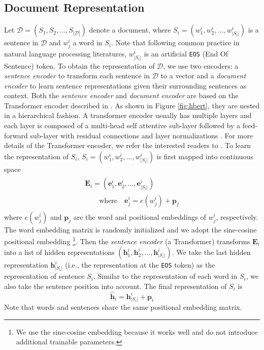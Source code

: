 \documentclass[11pt,a4paper]{article}
\begin{document}
\subsection{Document Representation}
\label{sec:doc_repr}
Let $\mathcal{D} = (S_1, S_2, \dots, S_{| \mathcal{D} |})$ denote a document,  where $S_i = (w_1^i, w_2^i, \dots, w_{|S_i|}^i)$ is a sentence in $\mathcal{D}$ and $w_j^i$ a word in $S_i$. Note that following common practice in natural language processing literatures, $w_{|S_i|}^i$ is an artificial {\tt EOS} (End Of Sentence) token. To obtain the representation of $\mathcal{D}$, we use two encoders: a \emph{sentence encoder} to transform each sentence in $\mathcal{D}$ to a vector and a \emph{document encoder} to learn sentence representations given their surrounding sentences as context. Both the \emph{sentence encoder} and \emph{document encoder} are based on the Transformer encoder described in . As shown in Figure \ref{fig:hbert}, they are nested in a hierarchical fashion. A transformer encoder usually has multiple layers and each layer is composed of a multi-head self attentive sub-layer followed by a feed-forward sub-layer with residual connections \cite{he:2016:cvpr} and layer normalizations \cite{ba:2016:arxiv}. For more details of the Transformer encoder, we refer the interested readers to . To learn the representation of $S_i$, $S_i= (w_1^i, w_2^i, \dots, w_{|S_i|}^i)$ is first mapped into continuous space
\begin{align}
\label{eq:emb}
\begin{split}
\mathbf{E}_i = (\mathbf{e}_1^i, \mathbf{e}_2^i, \dots, \mathbf{e}_{|S_i|}^i) \\
\quad  \quad  \text{where} \quad \mathbf{e}_j^i = e(w_j^i) + \mathbf{p}_j
\end{split}
\end{align}
where $e(w_j^i)$ and $\mathbf{p}_j$ are the word and positional embeddings of $w_j^i$, respectively. The word embedding matrix is randomly initialized and we adopt the sine-cosine positional embedding \cite{vaswani:2017:nips}\footnote{We use the sine-cosine embedding because it works well and do not introduce additional trainable parameters.}. Then the \emph{sentence encoder} (a Transformer) transforms $\mathbf{E}_i$ into a list of hidden representations $(\mathbf{h}_1^i, \mathbf{h}_2^i, \dots, \mathbf{h}_{|S_i|}^i)$. We take the last hidden representation $\mathbf{h}_{|S_i|}^i$ (i.e., the representation at the {\tt EOS} token) as the representation of sentence $S_i$. Similar to the representation of each word in $S_i$, we also take the sentence position into account. The final representation of $S_i$ is 
\begin{equation}
\hat{\mathbf{h}}_i = \mathbf{h}_{|S_i|}^i + \mathbf{p}_i
\end{equation}
Note that words and sentences share the same positional embedding matrix. 
\end{document}
